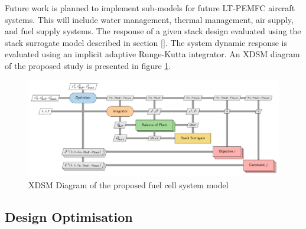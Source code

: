 Future work is planned to implement sub-models for future LT-PEMFC aircraft systems. This will include water management, thermal management, air supply, and fuel supply systems. The response of a given stack design evaluated using the stack surrogate model described in section []. The system dynamic response is evaluated using an implicit adaptive Runge-Kutta integrator. An XDSM diagram of the proposed study is presented in figure \ref{fig:xdsm}.

\begin{center}
	\begin{figure}
		\includegraphics[width=\linewidth]{figures/xdsm.pdf}
		\caption{XDSM Diagram of the proposed fuel cell system model}
		\label{fig:xdsm}
	\end{figure}
\end{center}

\subsection{Design Optimisation}

